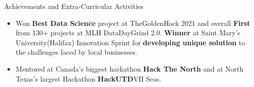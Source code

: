 \documentclass{resume} %
\begin{document}


\begin{rSection}{Achievements and Extra-Curricular Activities} 
\begin{itemize}
    \item Won \textbf{Best Data Science} project at TheGoldenHack 2021 and overall \textbf{First} from 130+ projects at MLH DataDayGrind 2.0. \textbf{Winner} at Saint Mary's University(Halifax) Innovation Sprint for \textbf{developing unique solution} to the challenges faced by local businesses.
    \item Mentored at Canada's biggest hackathon \textbf{Hack The North} and at North Texas's largest Hackathon \textbf{HackUTD}VII Seas.
\end{itemize}
\end{rSection}
\end{document}
